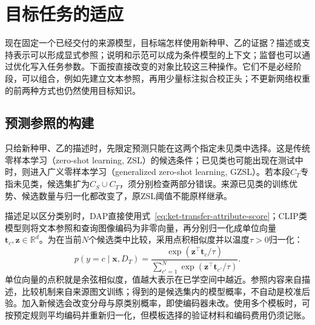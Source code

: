 \section{目标任务的适应}
\label{sec:ket-transfer-adaptation}

现在固定一个已经交付的来源模型，目标端怎样使用新种甲、乙的证据？描述或支持表示可以形成显式参照；说明和示范可以成为条件模型的上下文；监督也可以通过优化写入任务参数。下面按直接改变的对象比较这三种操作。它们不是必经阶段，可以组合，例如先建立文本参照，再用少量标注拟合校正头；不更新网络权重的前两种方式也仍然使用目标知识。

\subsection{预测参照的构建}
\label{sec:ket-transfer-references}

只给新种甲、乙的描述时，先限定预测只能在这两个指定未见类中选择。这是传统零样本学习（zero-shot learning, ZSL）的候选条件；已见类也可能出现在测试中时，则进入广义零样本学习（generalized zero-shot learning, GZSL）。若本段$C_T$专指未见类，候选集扩为$C_S\cup C_T$，须分别检查两部分错误。来源已见类的训练优势、候选数量与归一化都改变了，原ZSL阈值不能原样继承。

描述足以区分类别时，DAP直接使用式~\eqref{eq:ket-transfer-attribute-score}；CLIP类模型则将文本参照和查询图像编码为非零向量，再分别归一化成单位向量$\bm t_c,\bm z\in\mathbb R^d$。为在当前$N$个候选类中比较，采用点积相似度并以温度$\tau>0$归一化：
\begin{equation}
  p(y=c\mid\bm x,D_T)
  =\frac{\exp(\bm z^\top\bm t_c/\tau)}
         {\sum_{c'=1}^{N}\exp(\bm z^\top\bm t_{c'}/\tau)}.
  \label{eq:ket-transfer-text-reference}
\end{equation}
单位向量的点积就是余弦相似度，值越大表示在已学空间中越近。参照内容来自描述，比较机制来自来源图文训练；得到的是候选集内的模型概率，不自动是校准后验。加入新候选会改变分母与原类别概率，即使编码器未改。使用多个模板时，可按预定规则平均编码并重新归一化，但模板选择的验证材料和编码费用仍须记账。

